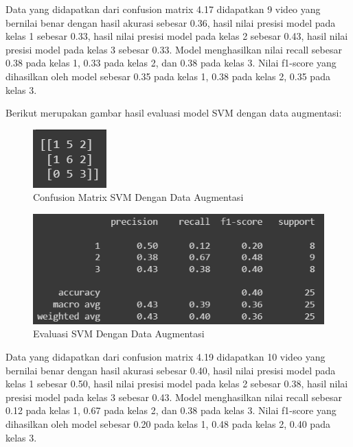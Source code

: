 Data yang didapatkan dari confusion matrix 4.17 didapatkan 9 video yang bernilai benar
dengan hasil akurasi sebesar 0.36, hasil nilai presisi model pada kelas 1 sebesar 0.33, hasil
nilai presisi model pada kelas 2 sebesar 0.43, hasil nilai presisi model pada kelas 3 sebesar 0.33.
Model menghasilkan nilai recall sebesar 0.38 pada kelas 1, 0.33 pada kelas 2, dan 0.38 pada
kelas 3. Nilai f1-score yang dihasilkan oleh model sebesar 0.35 pada kelas 1, 0.38 pada kelas
2, 0.35 pada kelas 3.

Berikut merupakan gambar hasil evaluasi model SVM dengan data augmentasi:

\begin{figure} [H] \centering
  \includegraphics[scale=5]{gambar/CMSVMaug.png}
  \caption{Confusion Matrix SVM Dengan Data Augmentasi}
  \label{fig:CMSVMaug}
\end{figure}

\begin{figure} [H] \centering
  \includegraphics[scale=1]{gambar/scoreSVMaug.png}
  \caption{Evaluasi SVM Dengan Data Augmentasi}
  \label{fig:ScoreSVMaug}
\end{figure}

Data yang didapatkan dari confusion matrix 4.19 didapatkan 10 video yang bernilai benar
dengan hasil akurasi sebesar 0.40, hasil nilai presisi model pada kelas 1 sebesar 0.50, hasil
nilai presisi model pada kelas 2 sebesar 0.38, hasil nilai presisi model pada kelas 3 sebesar 0.43.
Model menghasilkan nilai recall sebesar 0.12 pada kelas 1, 0.67 pada kelas 2, dan 0.38 pada
kelas 3. Nilai f1-score yang dihasilkan oleh model sebesar 0.20 pada kelas 1, 0.48 pada kelas
2, 0.40 pada kelas 3.

